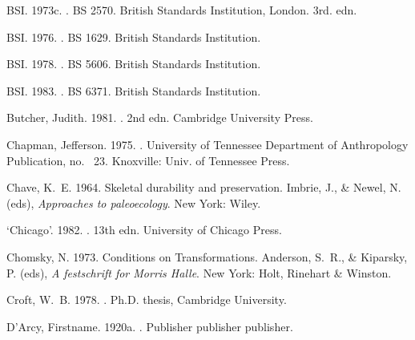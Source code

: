 \begin{thebibliography}{}
BSI. 1973c.
.
\newblock BS 2570. British Standards Institution, London.
\newblock 3rd. edn.

BSI. 1976.
.
\newblock BS 1629. British Standards Institution.

BSI. 1978.
.
\newblock BS 5606. British Standards Institution.

BSI. 1983.
.
\newblock BS 6371. British Standards Institution.

Butcher, Judith. 1981.
. 2nd edn.
\newblock Cambridge University Press.

Chapman, Jefferson. 1975.
.
\newblock University of Tennessee Department of Anthropology Publication, no.
  ~23.
\newblock Knoxville: Univ. of Tennessee Press.

Chave, K.~E. 1964.
\newblock Skeletal durability and preservation.
 Imbrie, J., \& Newel, N. (eds), {\em
  Approaches to paleoecology}.
\newblock New York: Wiley.

`Chicago'. 1982.
. 13th edn.
\newblock University of Chicago Press.

Chomsky, N. 1973.
\newblock Conditions on Transformations.
 Anderson, S.~R., \& Kiparsky, P. (eds), {\em A festschrift
  for {Morris Halle}}.
\newblock New York: Holt, Rinehart \& Winston.

Croft, W.~B. 1978.
.
\newblock Ph.D. thesis, Cambridge University.

D'Arcy, Firstname. 1920a.
.
\newblock Publisher publisher publisher.


\end{thebibliography}
